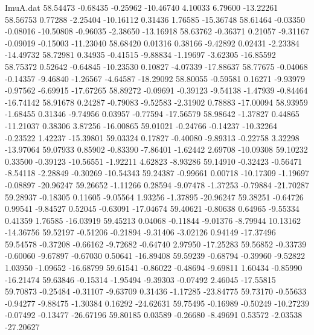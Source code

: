 \begin{filecontents}{ImuA.dat}
  58.54473   -0.68435   -0.25962  -10.46740    4.10033    6.79600  -13.22261
  58.56753    0.77288   -2.25404  -10.16112    0.31436    1.76585  -15.36748
  58.61464   -0.03350   -0.08016  -10.50808   -0.96035   -2.38650  -13.16918
  58.63762   -0.36371    0.21057   -9.31167   -0.09019   -0.15003  -11.23040
  58.68420    0.01316    0.38166   -9.42892    0.02431   -2.23384  -14.49732
  58.72981    0.34935   -0.41515   -9.88834   -1.19697   -3.62305  -16.85592
  58.75372    0.52642   -0.64845  -10.23530    0.10827   -4.07339  -17.88637
  58.77675   -0.04068   -0.14357   -9.46840   -1.26567   -4.64587  -18.29092
  58.80055   -0.59581    0.16271   -9.93979   -0.97562   -6.69915  -17.67265
  58.89272   -0.09691   -0.39123   -9.54138   -1.47939   -0.84464  -16.74142
  58.91678    0.24287   -0.79083   -9.52583   -2.31902    0.78883  -17.00094
  58.93959   -1.68455    0.31346   -9.74956    0.03957   -0.77594  -17.56579
  58.98642   -1.37827    0.44865  -11.21037    0.38306    3.87256  -16.00865
  59.01021   -0.24766   -0.14237  -10.32264   -0.23522    1.42237  -15.39801
  59.03324    0.17827   -0.40080   -9.89313   -0.22758    3.32298  -13.97064
  59.07933    0.85902   -0.83390   -7.86401   -1.62442    2.69708  -10.09308
  59.10232    0.33500   -0.39123  -10.56551   -1.92211    4.62823   -8.93286
  59.14910   -0.32423   -0.56471   -8.54118   -2.28849   -0.30269  -10.54343
  59.24387   -0.99661    0.00718  -10.17309   -1.19697   -0.08897  -20.96247
  59.26652   -1.11266    0.28594   -9.07478   -1.37253   -0.79884  -21.70287
  59.28937   -0.18305    0.11605   -9.05564    1.93256   -1.37895  -20.96247
  59.38251   -0.64726    0.99541   -9.84527    0.52045   -0.63091  -17.04674
  59.40621   -0.80638    0.64965   -9.55334    0.41359    1.76585  -16.03919
  59.45213    0.04068   -0.11844   -9.01376   -8.79944   10.13162  -14.36756
  59.52197   -0.51206   -0.21894   -9.31406   -3.02126    0.94149  -17.37496
  59.54578   -0.37208   -0.66162   -9.72682   -0.64740    2.97950  -17.25283
  59.56852   -0.33739   -0.60060   -9.67897   -0.67030    0.50641  -16.89408
  59.59239   -0.68794   -0.39960   -9.52822    1.03950   -1.09652  -16.68799
  59.61541   -0.86022   -0.48694   -9.69811    1.60434   -0.85990  -16.21474
  59.63846   -0.15314   -1.95494   -9.39303   -0.07492    2.46045  -17.55815
  59.70873   -0.25484   -0.31107   -9.63709    0.31436   -1.17285  -23.84775
  59.73170   -0.55633   -0.94277   -9.88475   -1.30384    0.16292  -24.62631
  59.75495   -0.16989   -0.50249  -10.27239   -0.07492   -0.13477  -26.67196
  59.80185    0.03589   -0.26680   -8.49691    0.53572   -2.03538  -27.20627

\end{filecontents}
